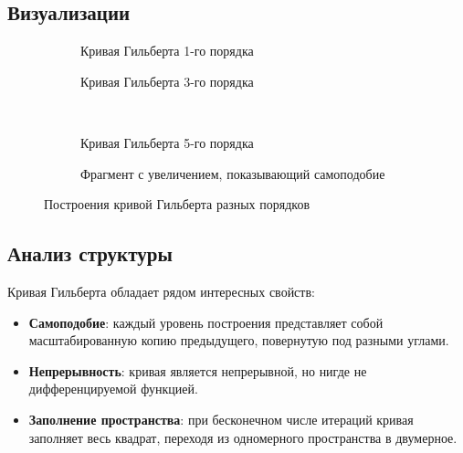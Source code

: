 \subsection{Визуализации}

\begin{figure}[H]
    \centering
    \begin{subfigure}{0.45\textwidth}
        \caption{Кривая Гильберта 1-го порядка}
    \end{subfigure}
    \hfill
    \begin{subfigure}{0.45\textwidth}
        \caption{Кривая Гильберта 3-го порядка}
    \end{subfigure}
    \\
    \begin{subfigure}{0.45\textwidth}
        \caption{Кривая Гильберта 5-го порядка}
    \end{subfigure}
    \hfill
    \begin{subfigure}{0.45\textwidth}
        \caption{Фрагмент с увеличением, показывающий самоподобие}
    \end{subfigure}
    \caption{Построения кривой Гильберта разных порядков}
\end{figure}

\subsection{Анализ структуры}

Кривая Гильберта обладает рядом интересных свойств:
\begin{itemize}
    \item \textbf{Самоподобие}: каждый уровень построения представляет собой масштабированную копию предыдущего, повернутую под разными углами.
    \item \textbf{Непрерывность}: кривая является непрерывной, но нигде не дифференцируемой функцией.
    \item \textbf{Заполнение пространства}: при бесконечном числе итераций кривая заполняет весь квадрат, переходя из одномерного пространства в двумерное.
\end{itemize}